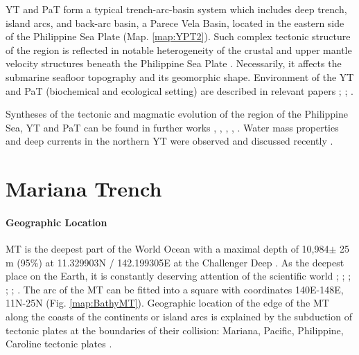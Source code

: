 \documentclass[11pt,a4paper]{report}
\begin{document}
\ac{YT} and \ac{PaT} form a typical trench-arc-basin system which includes deep trench, island arcs, and back-arc basin, a Parece Vela Basin, located in the eastern side of the Philippine Sea Plate (Map. \ref{map:YPT2}). Such complex tectonic structure of the region is reflected in notable heterogeneity of the crustal and upper mantle velocity structures beneath the Philippine Sea Plate \cite{OdaSenna1994}. Necessarily, it affects the submarine seafloor topography and its geomorphic shape. Environment of the \ac{YT} and \ac{PaT} (biochemical and ecological setting) are described in relevant papers \cite{Yangetal2018}; \cite{Xuetal2018}; \cite{Liuetal2018a}. 

Syntheses of the tectonic and magmatic evolution of the region of the Philippine Sea, \ac{YT} and \ac{PaT} can be found in further works \cite{Beccaluvaetal1986}, \cite{Pilletetal1999}, \cite{Setonetal2012}, \cite{Oharaetal2002}, \cite{Tsuboietal2014}. Water mass properties and deep currents in the northern \ac{YT} were observed and discussed recently \cite{Liuetal2018a}.

\pagebreak
\section{Mariana Trench}

\paragraph{Geographic Location}
\ac{MT} is the deepest part of the World Ocean with a maximal depth of 10,984$\pm$ 25 m (95\%) at 11.329903\degree\space N / 142.199305\degree\space E at the Challenger Deep \cite{Gardneretal2014}. As the deepest place on the Earth, it is constantly deserving attention of the scientific world \cite{Chadwicketal2018}; \cite{CurtisMoyer2005}; \cite{Faccennaetal2018}; \cite{Fujiokaetal2002}; \cite{Theberge2008}; \cite{Tianetal2018}. The arc of the \ac{MT} can be fitted into a square with coordinates 140\degree E-148\degree E, 11\degree N-25\degree N (Fig. \ref{map:BathyMT}). Geographic location of the edge of the \ac{MT} along the coasts of the continents or island arcs is explained by the subduction of tectonic plates at the boundaries of their collision: Mariana, Pacific, Philippine, Caroline tectonic plates \cite{Ishibashietal2015}. 
\end{document}
